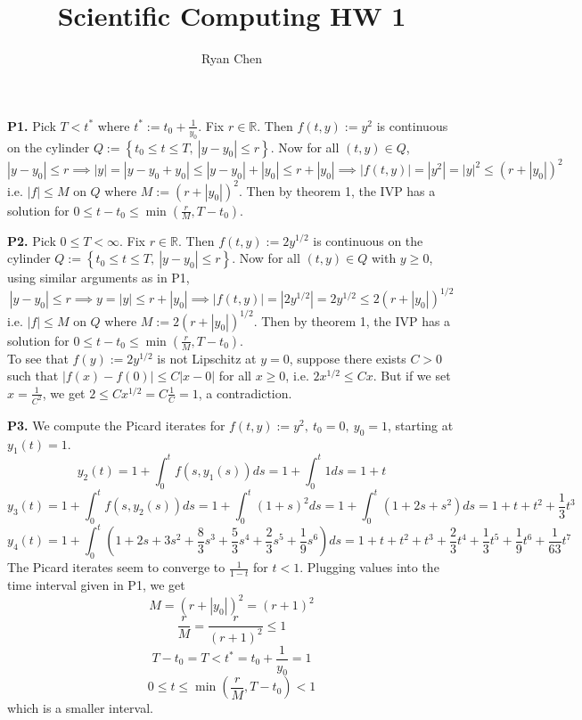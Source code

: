 \documentclass{article}
\title{Scientific Computing HW 1}
\author{Ryan Chen}
\def\mbb#1{\mathbb{#1}}
\def\tbf#1{\textbf{#1}}
\def\bR{\mbb{R}}
\newcommand{\br}[1]{\left(#1\right)}
\newcommand{\brc}[1]{\left\{#1\right\}}
\newcommand{\imp}{\implies}
\newcommand{\sep}[1][.5cm]{\vspace{#1}}
\begin{document}
\maketitle



\tbf{P1.} Pick $T<t^*$ where $t^*:=t_0+\frac{1}{y_0}$. Fix $r\in\bR$. Then $f(t,y):=y^2$ is continuous on the cylinder $Q:=\brc{t_0\le t\le T,~|y-y_0|\le r}$. Now for all $(t,y)\in Q$,
$$|y-y_0|\le r
\imp |y| = |y-y_0+y_0|
\le |y-y_0|+|y_0|
\le r+|y_0|
\imp |f(t,y)| = |y^2| = |y|^2 \le (r+|y_0|)^2$$
i.e. $|f|\le M$ on $Q$ where $M:=(r+|y_0|)^2$. Then by theorem 1, the IVP has a solution for $0\le t-t_0\le \min(\tfrac rM,T-t_0)$.
\sep



\tbf{P2.} Pick $0\le T<\infty$. Fix $r\in\bR$. Then $f(t,y):=2y^{1/2}$ is continuous on the cylinder $Q:=\brc{t_0\le t\le T,~|y-y_0|\le r}$. Now for all $(t,y)\in Q$ with $y\ge0$, using similar arguments as in P1,
$$|y-y_0|\le r
\imp y = |y| \le r+|y_0|
\imp |f(t,y)| = |2y^{1/2}| = 2y^{1/2} \le 2(r+|y_0|)^{1/2}$$
i.e. $|f|\le M$ on $Q$ where $M:=2(r+|y_0|)^{1/2}$. Then by theorem 1, the IVP has a solution for $0\le t-t_0\le \min(\frac rM,T-t_0)$.\\

To see that $f(y):=2y^{1/2}$ is not Lipschitz at $y=0$, suppose there exists $C>0$ such that $|f(x)-f(0)|\le C|x-0|$ for all $x\ge0$, i.e. $2x^{1/2}\le Cx$. But if we set $x=\frac{1}{C^2}$, we get $2\le Cx^{1/2}=C\frac1C=1$, a contradiction.
\sep



\tbf{P3.} We compute the Picard iterates for $f(t,y):=y^2,~t_0=0,~y_0=1$, starting at $y_1(t)=1$.
$$y_2(t) = 1 + \int_0^t f(s,y_1(s))ds = 1 + \int_0^t 1ds = 1 + t$$
$$y_3(t) = 1 + \int_0^t f(s,y_2(s))ds = 1 + \int_0^t (1+s)^2ds = 1 + \int_0^t (1+2s+s^2)ds = 1+t+t^2+\frac13t^3$$
$$y_4(t) = 1 + \int_0^t\br{1+2s+3s^2+\frac83s^3+\frac53s^4+\frac23s^5+\frac19s^6}ds = 1+t+t^2+t^3+\frac23t^4+\frac13t^5+\frac19t^6+\frac1{63}t^7$$
The Picard iterates seem to converge to $\frac1{1-t}$ for $t<1$. Plugging values into the time interval given in P1, we get
$$M = (r+|y_0|)^2 = (r+1)^2$$
$$\frac rM = \frac{r}{(r+1)^2} \le 1$$
$$T-t_0 = T < t^* = t_0+\frac{1}{y_0} = 1$$
$$0 \le t \le \min\br{\frac rM,T-t_0} < 1$$
which is a smaller interval.
\sep
\end{document}

